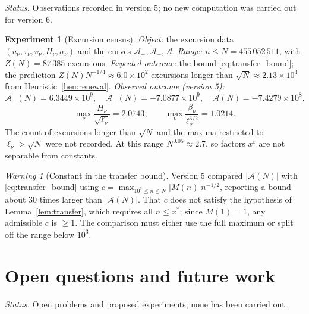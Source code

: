 \documentclass[11pt]{amsart}
\numberwithin{equation}{section}
\theoremstyle{plain}
\theoremstyle{definition}
\newtheorem{experiment}[theorem]{Experiment}
\theoremstyle{remark}
\newtheorem{warning}[theorem]{Warning}
\newcommand{\Ap}{\mathcal{A}_{+}}
\newcommand{\Am}{\mathcal{A}_{-}}
\newcommand{\Anet}{\mathcal{A}}
\newcommand{\eps}{\varepsilon}
\begin{document}
\noindent\emph{Status.} Observations recorded in version 5; no new
computation was carried out for version 6.

\begin{experiment}[Excursion census]
\label{exp:census}
\emph{Object:} the excursion data $(u_\nu,\tau_\nu,v_\nu,H_\nu,\sigma_\nu)$
and the curves $\Ap,\Am,\Anet$.
\emph{Range:} $n\le N=455\,052\,511$, with $Z(N)=87\,385$ excursions.
\emph{Expected outcome:} the bound \eqref{eq:transfer_bound}; the prediction
$Z(N)N^{-1/4}\approx6.0\times10^2$ excursions longer than
$\sqrt N\approx2.13\times10^4$ from Heuristic~\ref{heu:renewal}.
\emph{Observed outcome (version 5):}
\begin{equation}
\label{eq:census_values}
  \Ap(N)=6.3449\times10^9,\quad \Am(N)=-7.0877\times10^9,\quad
  \Anet(N)=-7.4279\times10^8,
\end{equation}
\begin{equation}
\label{eq:census_max}
  \max_\nu\frac{H_\nu}{\sqrt{\ell_\nu}}=2.0743,\qquad
  \max_\nu\frac{\beta_\nu}{\ell_\nu^{3/2}}=1.0214 .
\end{equation}
The count of excursions longer than $\sqrt N$ and the maxima restricted to
$\ell_\nu>\sqrt N$ were not recorded. At this range $N^{0.05}\approx2.7$, so
factors $x^\eps$ are not separable from constants.
\end{experiment}

\begin{warning}[Constant in the transfer bound]
\label{warn:census_c}
Version 5 compared $|\Anet(N)|$ with \eqref{eq:transfer_bound} using
$c=\max_{10^3\le n\le N}|M(n)|n^{-1/2}$, reporting a bound about $30$ times
larger than $|\Anet(N)|$. That $c$ does not satisfy the hypothesis of
Lemma~\ref{lem:transfer}, which requires all $n\le x^*$; since $M(1)=1$, any
admissible $c$ is $\ge1$. The comparison must either use the full maximum or
split off the range below $10^3$.
\end{warning}

\section{Open questions and future work}
\label{sec:open_questions}

\noindent\emph{Status.} Open problems and proposed experiments; none has
been carried out.
\end{document}
